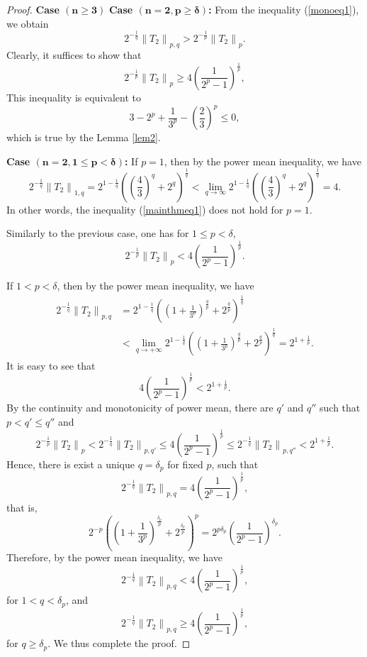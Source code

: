 \documentclass{amsart}
\begin{document}
\begin{proof} {\bf Case $\boldsymbol{(n\geq3)}$}
{\bf Case $\boldsymbol{(n=2, p\geq\delta)}$:}  From the inequality (\ref{monoeq1}), we obtain
$$
2^{-\frac{1}{q}}\left\|T_{2}\right\|_{p,q}>2^{-\frac{1}{p}}\left\|T_{2}\right\|_{p}.
$$
Clearly, it suffices to show that 
\begin{equation}\label{eq12}
2^{-\frac{1}{p}}\left\|T_{2}\right\|_{p} \geq 4\left(\frac{1}{2^{p}-1}\right)^{\frac{1}{p}},
\end{equation}
This inequality is equivalent to
 $$3-2^p+\frac{1}{3^p}-\left(\frac{2}{3}\right)^p\leq0,$$
which is true by the Lemma \ref{lem2}.

 {\bf Case $\boldsymbol{(n=2, 1\leq p<\delta)}$:} If $p=1$, then by the power mean inequality, we have
$$2^{-\frac{1}{q}}\left\|T_{2}\right\|_{1, q}=2^{1-\frac{1}{q}}\left(\left(\frac{4}{3}\right)^q+2^q\right)^\frac{1}{q}<\lim_{q\to\infty}2^{1-\frac{1}{q}}\left(\left(\frac{4}{3}\right)^q+2^q\right)^\frac{1}{q}=4.$$
In other words, the inequality (\ref{mainthmeq1}) does not hold for $p=1$.
 
Similarly to the previous case, one has for $1\leq p<\delta$,
\begin{equation}\label{thmeqq2}
2^{-\frac{1}{p}}\left\|T_{2}\right\|_{p} < 4\left(\frac{1}{2^{p}-1}\right)^{\frac{1}{p}}.
\end{equation}


If $1< p<\delta$, then by the power mean inequality, we have  
\begin{align*}
2^{-\frac{1}{q}}\left\|T_{2}\right\|_{p,q}&=2^{1-\frac{1}{q}}\left(\left(1+\frac{1}{3^p}\right)^\frac{q}{p}+2^\frac{q}{p}\right)^\frac{1}{q}\\
&<\lim_{q\to+\infty}2^{1-\frac{1}{q}}\left(\left(1+\frac{1}{3^p}\right)^\frac{q}{p}+2^\frac{q}{p}\right)^\frac{1}{q}=2^{1+\frac{1}{p}}.
\end{align*}
It is easy to see that
$$4\left(\frac{1}{2^{p}-1}\right)^{\frac{1}{p}}<2^{1+\frac{1}{p}}.$$
By the continuity and monotonicity of power mean, there are $q'$ and $q''$ such that $p<q'\leq q''$ and 
$$
2^{-\frac{1}{p}}\left\|T_{2}\right\|_{p}<2^{-\frac{1}{q}}\left\|T_{2}\right\|_{p, q'}\leq4\left(\frac{1}{2^p-1}\right)^{\frac{1}{p}}\leq2^{-\frac{1}{q}}\left\|T_{2}\right\|_{p, q''}<2^{1+\frac{1}{p}}.
$$
Hence, there is exist a unique $q=\delta_p$ for fixed $p$, such that
$$2^{-\frac{1}{q}}\left\|T_{2}\right\|_{p,q}=4\left(\frac{1}{2^p-1}\right)^{\frac{1}{p}},$$
that is,
$$2^{-p}\left(\left(1+\frac{1}{3^p}\right)^\frac{\delta_p}{p}+2^\frac{\delta_p}{p}\right)^p=2^{p\delta_p}\left(\frac{1}{2^p-1}\right)^{\delta_p}.$$
Therefore, by the power mean inequality, we have
$$
2^{-\frac{1}{q}}\left\|T_{2}\right\|_{p,q}<4\left(\frac{1}{2^{p}-1}\right)^{\frac{1}{p}},
$$
for $1<q<\delta_p$, and 
$$
2^{-\frac{1}{q}}\left\|T_{2}\right\|_{p,q}\geq4\left(\frac{1}{2^{p}-1}\right)^{\frac{1}{p}},
$$
for $q\geq\delta_p$. We thus complete the proof.
\end{proof}
\end{document}
